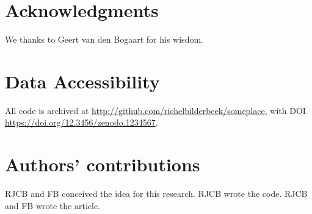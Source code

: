 \documentclass{article}
\newcommand{\richel}[1]{\textcolor{orange}{\textbf{[RB: #1]}}}
\begin{document}

\section{Acknowledgments}

We thanks to Geert van den Bogaart for his wisdom.

\section{Data Accessibility}

All code is archived at \url{http://github.com/richelbilderbeek/someplace},
with DOI \url{https://doi.org/12.3456/zenodo.1234567}.

\section{Authors' contributions}

RJCB and FB conceived the idea for this research. 
RJCB wrote the code.
RJCB and FB wrote the article.



\end{document}
